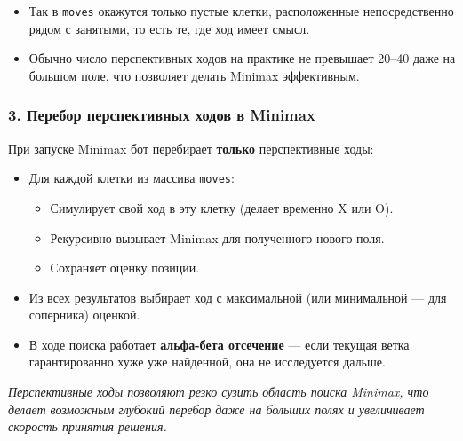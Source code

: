 \begin{itemize}
    \item Так в \verb|moves| окажутся только пустые клетки, расположенные непосредственно рядом с занятыми, то есть те, где ход имеет смысл.
    \item Обычно число перспективных ходов на практике не превышает 20–40 даже на большом поле, что позволяет делать Minimax эффективным.
\end{itemize}

\subsubsection*{3. Перебор перспективных ходов в Minimax}

При запуске Minimax бот перебирает \textbf{только} перспективные ходы:

\begin{itemize}
    \item Для каждой клетки из массива \verb|moves|:
        \begin{itemize}
            \item Симулирует свой ход в эту клетку (делает временно X или O).
            \item Рекурсивно вызывает Minimax для полученного нового поля.
            \item Сохраняет оценку позиции.
        \end{itemize}
    \item Из всех результатов выбирает ход с максимальной (или минимальной — для соперника) оценкой.
    \item В ходе поиска работает \textbf{альфа-бета отсечение} — если текущая ветка гарантированно хуже уже найденной, она не исследуется дальше.
\end{itemize}

\vspace{0.5em}

\textit{Перспективные ходы позволяют резко сузить область поиска Minimax, что делает возможным глубокий перебор даже на больших полях и увеличивает скорость принятия решения.}

